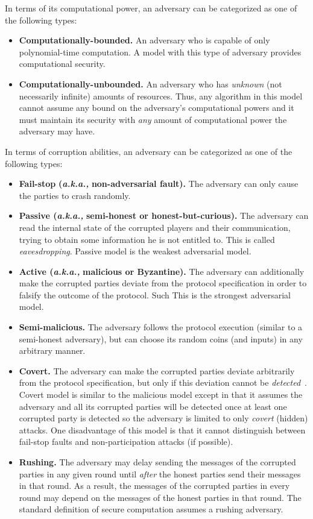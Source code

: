 \documentclass[11pt]{article}
\theoremstyle{plain}
\begin{document}
In terms of its computational power, an adversary can be categorized
as one of the following types:
\begin{itemize}
	\item \textbf{Computationally-bounded.} An adversary who is capable of only
	polynomial-time computation. A model with this type of adversary provides
	computational security.
	\item \textbf{Computationally-unbounded.} An adversary who has \emph{unknown}
	(not necessarily infinite) amounts of resources. Thus, any algorithm
	in this model cannot assume any bound on the adversary's computational
	powers and it must maintain its security with \emph{any} amount of
	computational power the adversary may have. 
\end{itemize}
In terms of corruption abilities, an adversary can be categorized
as one of the following types:
\begin{itemize}
	\item \textbf{Fail-stop} \textbf{(}\textbf{\emph{a.k.a.,}}\textbf{ non-adversarial
		fault). }The adversary can only cause the parties to crash randomly.
	\item \textbf{Passive (}\textbf{\emph{a.k.a.,}}\textbf{ semi-honest or honest-but-curious).}
	The adversary can read the internal state of the corrupted players
	and their communication, trying to obtain some information he is not
	entitled to. This is called \emph{eavesdropping}. Passive model is
	the weakest adversarial model. 
	\item \textbf{Active (}\textbf{\emph{a.k.a.,}}\textbf{ malicious or Byzantine).}
	The adversary can additionally make the corrupted parties deviate
	from the protocol specification in order to falsify the outcome of
	the protocol. Such This is the strongest adversarial model. 
	\item \textbf{Semi-malicious. }The adversary\textbf{ }follows the protocol
	execution (similar to a semi-honest adversary), but can choose its
	random coins (and inputs) in any arbitrary manner.
	\item \textbf{Covert.} The adversary can make the corrupted parties deviate
	arbitrarily from the protocol specification, but only if this deviation
	cannot be \emph{detected}~\cite{Aumann:2010:SAC:1713119.1713121}.
	Covert model is similar to the malicious model except in that it assumes
	the adversary and all its corrupted parties will be detected once
	at least one corrupted party is detected so the adversary is limited
	to only \emph{covert} (hidden) attacks. One disadvantage of this model
	is that it cannot distinguish between fail-stop faults and non-participation
	attacks (if possible).
	\item \textbf{Rushing. }The adversary may delay sending the messages of
	the corrupted parties in any given round until \emph{after} the honest
	parties send their messages in that round. As a result, the messages
	of the corrupted parties in every round may depend on the messages
	of the honest parties in that round. The standard definition of secure
	computation assumes a rushing adversary.
\end{itemize}
\end{document}
